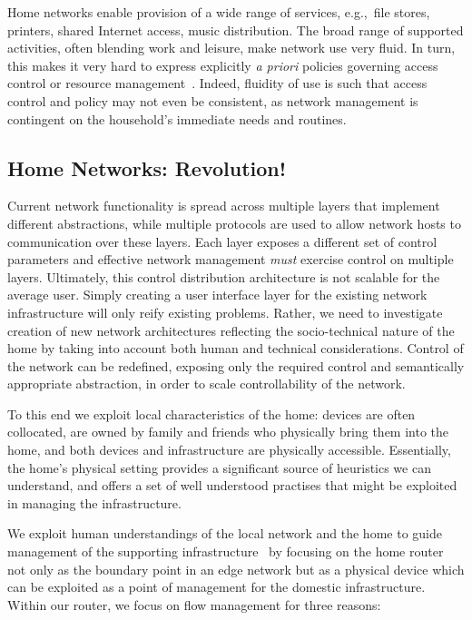 Home networks enable provision of a wide range of services, e.g.,~file stores,
printers, shared Internet access, music distribution.  The broad range of
supported activities, often blending work and leisure, make network use very
fluid.  In turn, this makes it very hard to express explicitly \emph{a priori}
policies governing access control or resource management~.
Indeed, fluidity of use is such that access control and policy may not even be
consistent, as network management is contingent on the household's immediate
needs and routines.

\subsection{Home Networks: Revolution!} \label{s:revolution}

Current network functionality is spread across multiple layers that implement
different abstractions, while multiple protocols are used to allow network hosts
to communication over these layers. Each layer exposes a different set of
control parameters and effective network management \emph{must} exercise control
on multiple layers. Ultimately, this control distribution architecture is not
scalable for the average user. Simply creating a user interface layer for the
existing network infrastructure will only reify existing problems.  Rather, we
need to investigate creation of new network architectures reflecting the
socio-technical nature of the home by taking into account both human and
technical considerations. Control of the network can be redefined, exposing only
the required control and semantically appropriate abstraction, in order to scale
controllability of the network.  

To this end we exploit local characteristics of the home: devices are often
collocated, are owned by family and friends who physically bring them into the
home, and both devices and infrastructure are physically accessible.
Essentially, the home's physical setting provides a significant source of
heuristics we can understand, and offers a set of well understood practises that
might be exploited in managing the infrastructure.  

We exploit human understandings of the local network and the home to guide
management of the supporting infrastructure~ by focusing on
the home router not only as the boundary point in an edge network but as a
physical device which can be exploited as a point of management for the domestic
infrastructure.  Within our router, we focus on flow management for three
reasons: 

